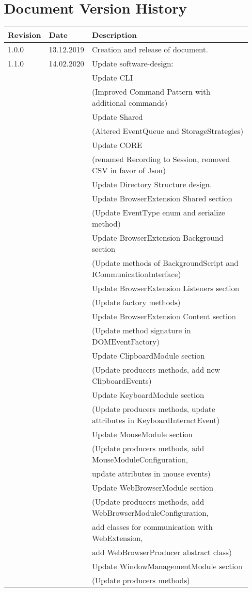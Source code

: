 \chapter*{Document Version History}
\label{ch:versionhistory}
\begin{table}[h]
\begin{tabular}{lll}
\textbf{Revision} & \textbf{Date} & \textbf{Description}              \\
\hline
1.0.0             & 13.12.2019    & Creation and release of document. \\
\hline
1.1.0			  & 14.02.2020	  & Update software-design: \\
&& Update CLI \\
&& (Improved Command Pattern with additional commands) \\
&& Update Shared \\
&& (Altered EventQueue and StorageStrategies) \\
&& Update CORE \\
&& (renamed Recording to Session, removed CSV in favor of Json) \\
&& Update Directory Structure design. \\                                                          
&& Update BrowserExtension Shared section\\
&& (Update EventType enum and serialize method)\\
&& Update BrowserExtension Background section\\
&& (Update methods of BackgroundScript and ICommunicationInterface)\\
&& Update BrowserExtension Listeners section\\
&& (Update factory methods)\\
&& Update BrowserExtension Content section\\
&& (Update method signature in DOMEventFactory)\\
&& Update ClipboardModule section\\
&& (Update producers methods, add new ClipboardEvents)\\
&& Update KeyboardModule section\\
&& (Update producers methods, update attributes in KeyboardInteractEvent)\\
&& Update MouseModule section\\
&& (Update producers methods, add MouseModuleConfiguration,\\
&& update attributes in mouse events)\\
&& Update WebBrowserModule section\\
&& (Update producers methods, add WebBrowserModuleConfiguration,\\
&& add classes for communication with WebExtension,\\
&& add WebBrowserProducer abstract class)\\
&& Update WindowManagementModule section\\
&& (Update producers methods)\\

\end{tabular}
\end{table}